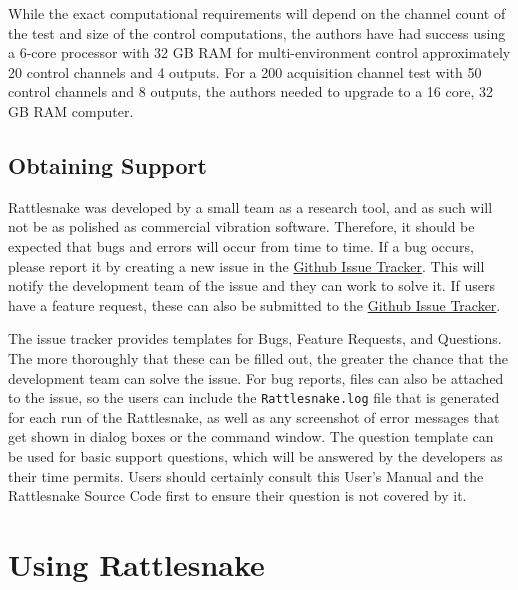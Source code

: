 \documentclass[pdf,12pt,report]{SANDreport}
\newcommand{\inlineCode}{\lstinline[basicstyle=\bfseries\ttfamily]}
\newcommand{\GitlabIssueTracker}{\href{https://github.com/sandialabs/rattlesnake-vibration-controller/issues}{Github Issue Tracker}}
\begin{document}
    While the exact computational requirements will depend on the channel count of the test and size of the control computations, the authors have had success using a 6-core processor with 32 GB RAM for multi-environment control approximately 20 control channels and 4 outputs.  For a 200 acquisition channel test with 50 control channels and 8 outputs, the authors needed to upgrade to a 16 core, 32 GB RAM computer.
    
    \section{Obtaining Support}\label{sec:intro_obtaining_support}
    Rattlesnake was developed by a small team as a research tool, and as such will not be as polished as commercial vibration software.  Therefore, it should be expected that bugs and errors will occur from time to time.  If a bug occurs, please report it by creating a new issue in the \GitlabIssueTracker.  This will notify the development team of the issue and they can work to solve it.  If users have a feature request, these can also be submitted to the \GitlabIssueTracker.
    
    The issue tracker provides templates for Bugs, Feature Requests, and Questions.  The more thoroughly that these can be filled out, the greater the chance that the development team can solve the issue.  For bug reports, files can also be attached to the issue, so the users can include the \inlineCode{Rattlesnake.log} file that is generated for each run of the Rattlesnake, as well as any screenshot of error messages that get shown in dialog boxes or the command window.  The question template can be used for basic support questions, which will be answered by the developers as their time permits.  Users should certainly consult this User's Manual and the Rattlesnake Source Code first to ensure their question is not covered by it.
    
    \chapter{Using Rattlesnake}\label{sec:using_rattlesnake}
\end{document}
